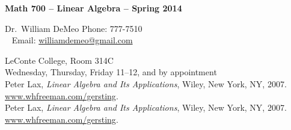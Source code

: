 \documentclass[12pt]{amsart}
\begin{document}
\thispagestyle{empty}

\begin{center} \textbf{Math 700 -- Linear Algebra -- Spring 2014}

 \end{center}
\vskip5mm

 Dr.~William DeMeo  \hfill {Phone: 777-7510}\\
~\phantom{XX} \hfill {Email: \href{mailto:williamdemeo@gmail.com}{williamdemeo@gmail.com}}

 LeConte College, Room 314C \\

 Wednesday, Thursday, Friday 11--12, and by appointment\\


 Peter Lax, \emph{Linear Algebra and Its Applications}, Wiley, New York, NY, 2007. \href{http://www.whfreeman.com/gersting}{www.whfreeman.com/gersting}. \\
 Peter Lax, \emph{Linear Algebra and Its Applications}, Wiley, New York, NY, 2007. \href{http://www.whfreeman.com/gersting}{www.whfreeman.com/gersting}. \\
\end{document}
